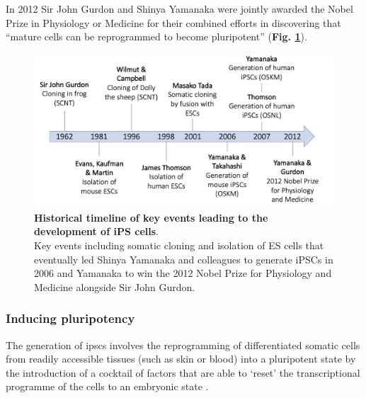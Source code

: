 In 2012 Sir John Gurdon and Shinya Yamanaka were jointly awarded the Nobel Prize in Physiology or Medicine for their combined efforts in discovering that “mature cells can be reprogrammed to become pluripotent” \cite{nobel2012press} (\textbf{Fig. \ref{fig:ipsc_timeline}}).    

\begin{figure}[h]
\centering
\includegraphics[width=15cm]{Chapter1/Fig/ipsc_timeline.png}
\caption[iPSCs timeline]{\textbf{Historical timeline of key events leading to the development of iPS cells}.\\
Key events including somatic cloning and isolation of ES cells that eventually led Shinya Yamanaka and colleagues to generate iPSCs in 2006 and Yamanaka to win the 2012 Nobel Prize for Physiology and Medicine alongside Sir John Gurdon.}
\label{fig:ipsc_timeline}
\end{figure}

\newpage

\subsubsection{Inducing pluripotency}

The generation of \glspl{ipsc} involves the reprogramming of differentiated somatic cells from readily accessible tissues (such as skin or blood) into a pluripotent state by the introduction of a cocktail of factors that are able to `reset' the transcriptional programme of the cells to an embryonic state \cite{saha2009technical}. \\

